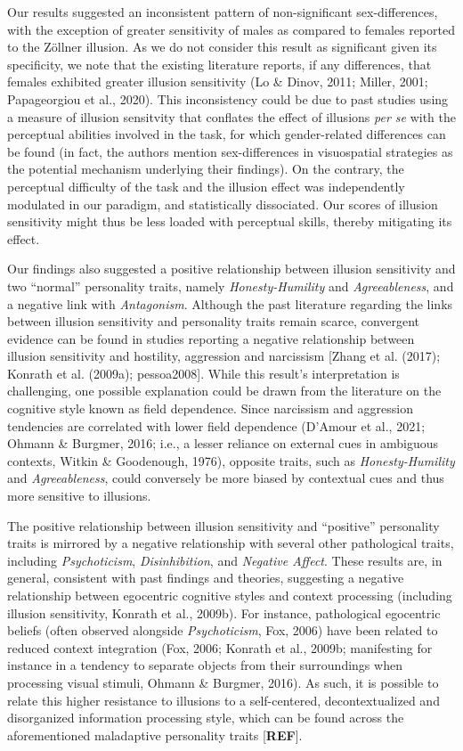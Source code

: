 \documentclass[
  man,floatsintext]{apa6}
\begin{document}
Our results suggested an inconsistent pattern of non-significant sex-differences, with the exception of greater sensitivity of males as compared to females reported to the Zöllner illusion. As we do not consider this result as significant given its specificity, we note that the existing literature reports, if any differences, that females exhibited greater illusion sensitivity (Lo \& Dinov, 2011; Miller, 2001; Papageorgiou et al., 2020). This inconsistency could be due to past studies using a measure of illusion sensitvity that conflates the effect of illusions \emph{per se} with the perceptual abilities involved in the task, for which gender-related differences can be found (in fact, the authors mention sex-differences in visuospatial strategies as the potential mechanism underlying their findings). On the contrary, the perceptual difficulty of the task and the illusion effect was independently modulated in our paradigm, and statistically dissociated. Our scores of illusion sensitivity might thus be less loaded with perceptual skills, thereby mitigating its effect.

Our findings also suggested a positive relationship between illusion sensitivity and two ``normal'' personality traits, namely \emph{Honesty-Humility} and \emph{Agreeableness}, and a negative link with \emph{Antagonism}. Although the past literature regarding the links between illusion sensitivity and personality traits remain scarce, convergent evidence can be found in studies reporting a negative relationship between illusion sensitivity and hostility, aggression and narcissism {[}Zhang et al. (2017); Konrath et al. (2009a); pessoa2008{]}. While this result's interpretation is challenging, one possible explanation could be drawn from the literature on the cognitive style known as field dependence. Since narcissism and aggression tendencies are correlated with lower field dependence (D'Amour et al., 2021; Ohmann \& Burgmer, 2016; i.e., a lesser reliance on external cues in ambiguous contexts, Witkin \& Goodenough, 1976), opposite traits, such as \emph{Honesty-Humility} and \emph{Agreeableness}, could conversely be more biased by contextual cues and thus more sensitive to illusions.

The positive relationship between illusion sensitivity and ``positive'' personality traits is mirrored by a negative relationship with several other pathological traits, including \emph{Psychoticism}, \emph{Disinhibition}, and \emph{Negative Affect}. These results are, in general, consistent with past findings and theories, suggesting a negative relationship between egocentric cognitive styles and context processing (including illusion sensitivity, Konrath et al., 2009b). For instance, pathological egocentric beliefs (often observed alongside \emph{Psychoticism}, Fox, 2006) have been related to reduced context integration (Fox, 2006; Konrath et al., 2009b; manifesting for instance in a tendency to separate objects from their surroundings when processing visual stimuli, Ohmann \& Burgmer, 2016). As such, it is possible to relate this higher resistance to illusions to a self-centered, decontextualized and disorganized information processing style, which can be found across the aforementioned maladaptive personality traits {[}\textbf{REF}{]}.
\end{document}
